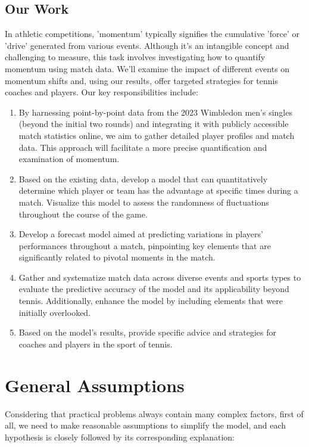 \documentclass[12pt]{article}  %
\begin{document}
\subsection{Our Work}
In athletic competitions, 'momentum' typically signifies the cumulative 'force' or 'drive' generated from various events. 
Although it's an intangible concept and challenging to measure, this task involves investigating how to quantify momentum using match data. 
We'll examine the impact of different events on momentum shifts and, using our results, 
offer targeted strategies for tennis coaches and players. Our key responsibilities include:
\begin{enumerate}[\bfseries 1.]
    \setlength{\parsep}{0ex} %
    \setlength{\topsep}{0.5pt} %
    \setlength{\itemsep}{0.5pt} %
    \item By harnessing point-by-point data from the 2023 Wimbledon men's singles (beyond the initial two rounds) and integrating it 
    with publicly accessible match statistics online, we aim to gather detailed player profiles and match data. 
    This approach will facilitate a more precise quantification and examination of momentum.
    \item Based on the existing data, develop a model that can quantitatively determine which player or team has the advantage at specific times 
    during a match. Visualize this model to assess the randomness of fluctuations throughout the course of the game.
    \item Develop a forecast model aimed at predicting variations in players' performances throughout a match, 
    pinpointing key elements that are significantly related to pivotal moments in the match.
    \item Gather and systematize match data across diverse events and sports types to evaluate 
    the predictive accuracy of the model and its applicability beyond tennis. Additionally, 
    enhance the model by including elements that were initially overlooked.
    \item Based on the model's results, provide specific advice and strategies for coaches and players in the sport of tennis.
\end{enumerate}

\section{General Assumptions}
Considering that practical problems always contain many complex factors, first of all, we need to make reasonable assumptions to simplify the model, and each hypothesis is closely followed by its corresponding explanation:
\end{document}
